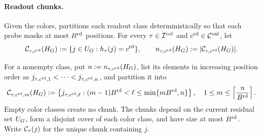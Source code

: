 \paragraph{Readout chunks.}
Given the colors,  partitions each readout class
deterministically so that
each probe masks at most $B^{\mathrm{rd}}$ positions.
For every $\tau\in\mathcal I^{\mathrm{col}}$ and
$c^{\mathrm{rd}}\in\mathcal C^{\mathrm{val}}$, let
\begin{equation}
 \mathcal C_{\tau,c^{\mathrm{rd}}}(H_{G})
 :=\{j\in U_{G}:
      h_{\tau}(j)=c^{\mathrm{rd}}\},
 \qquad
 n_{\tau,c^{\mathrm{rd}}}(H_{G})
 :=|\mathcal C_{\tau,c^{\mathrm{rd}}}(H_{G})|.
 \label{app:eq:color-class}
\end{equation}

For a nonempty class, put
$n:=n_{\tau,c^{\mathrm{rd}}}(H_{G})$, list its elements in increasing
position order as
$j_{\tau,c^{\mathrm{rd}},1}<\cdots<j_{\tau,c^{\mathrm{rd}},n}$, and
partition it into
\begin{equation}
 \mathcal C_{\tau,c^{\mathrm{rd}},m}(H_{G})
 :=\left\{
 j_{\tau,c^{\mathrm{rd}},\ell}:
 (m-1)B^{\mathrm{rd}}<\ell\le
 \min\{mB^{\mathrm{rd}},n\}
 \right\},
 \quad
 1\le m\le\left\lceil
 \frac{n}{B^{\mathrm{rd}}}
 \right\rceil.
 \label{app:eq:readout-chunks}
\end{equation}
Empty color classes create no chunk.  The chunks depend on the current
residual set $U_{G}$, form a disjoint cover of each color class,
and have size at most $B^{\mathrm{rd}}$.  Write $\mathcal C_{\tau}(j)$ for the unique chunk containing $j$.

